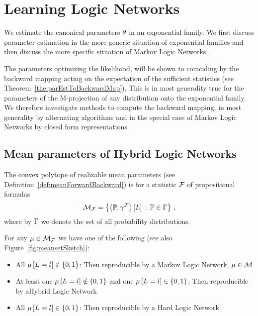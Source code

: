 \section{Learning Logic Networks}\label{cha:networkLearning}


We estimate the canonical parameters $\theta$ in an exponential family.
We first discuss parameter estimation in the more generic situation of exponential families and then discuss the more specific situation of Markov Logic Networks.

The parameters optimizing the likelihood, will be shown to coinciding by the backward mapping acting on the expectation of the sufficient statistics (see Theorem~\ref{the:parEstToBackwardMap}).
This is in most generality true for the parameters of the M-projection of any distribution onto the exponential family.
We therefore investigate methods to compute the backward mapping, in most generality by alternating algorithms and in the special case of Markov Logic Networks by closed form representations.


\subsection{Mean parameters of Hybrid Logic Networks}

The convex polytope of realizable mean parameters (see Definition~\ref{def:meanForwardBackward}) is for a statistic $\mathcal{F}$ of propositional formulas
	\[ \mathcal{M}_{\mathcal{F}} = \left\{ \left\langle \mathbb{P},\gamma^{\mathcal{F}}\right\rangle \left[ L \right] \, : \, \mathbb{P}\in\Gamma \right\} \, ,\]
where by $\Gamma$ we denote the set of all probability distributions.

For any $\mu\in\mathcal{M}_{\mathcal{F}}$ we have one of the following (see also Figure~\ref{fig:meansetSketch}):
\begin{itemize}
	\item All $\mu\left[L_{}=l_{}\right]\notin\{0,1\}$: Then reproducible by a Markov Logic Network, $\mu\in\mathcal{M}$
	\item At least one $\mu\left[L_{}=l_{}\right]\notin\{0,1\}$ and one $\mu\left[L_{}=l_{}\right]\in\{0,1\}$: Then reproducible by aHybrid Logic Network
	\item All $\mu\left[L_{}=l_{}\right]\in\{0,1\}$: Then reproducible by a Hard Logic Network
\end{itemize}



